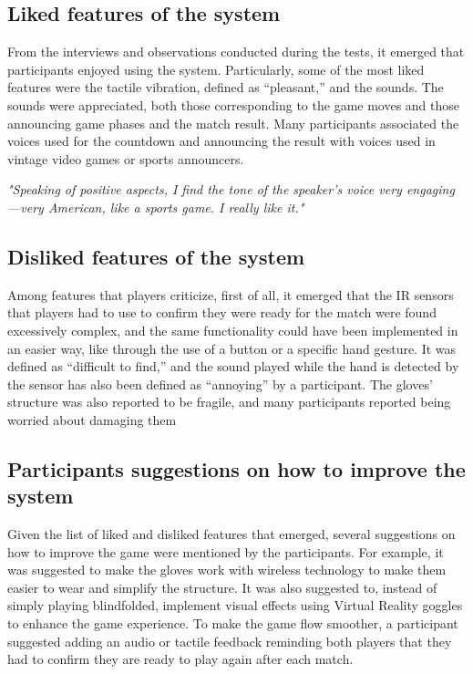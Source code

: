 \documentclass[11pt,a4paper]{report}
\begin{document}
\subsection*{Liked features of the system}
From the interviews and observations conducted during the tests, it emerged that participants enjoyed using the system. Particularly, some of the most liked features were the tactile vibration, defined as “pleasant,” and the sounds. The sounds were appreciated, both those corresponding to the game moves and those announcing game phases and the match result. Many participants associated the voices used for the countdown and announcing the result with voices used in vintage video games or sports announcers.
\begin{center}
  \textit{"Speaking of positive aspects, I find the tone of the speaker's voice very engaging—very American, like a sports game. I really like it."}
\end{center}

\subsection*{Disliked features of the system}
Among features that players criticize, first of all, it emerged that the IR sensors that players had to use to confirm they were ready for the match were found excessively complex, and the same functionality could have been implemented in an easier way, like through the use of a button or a specific hand gesture. It was defined as “difficult to find,” and the sound played while the hand is detected by the sensor has also been defined as “annoying” by a participant. The gloves' structure was also reported to be fragile, and many participants reported being worried about damaging them
\subsection*{Participants suggestions on how to improve the system
}
Given the list of liked and disliked features that emerged, several suggestions on how to improve the game were mentioned by the participants. For example, it was suggested to make the gloves work with wireless technology to make them easier to wear and simplify the structure. It was also suggested to, instead of simply playing blindfolded, implement visual effects using Virtual Reality goggles to enhance the game experience. To make the game flow smoother, a participant suggested adding an audio or tactile feedback reminding both players that they had to confirm they are ready to play again after each match.
\end{document}
